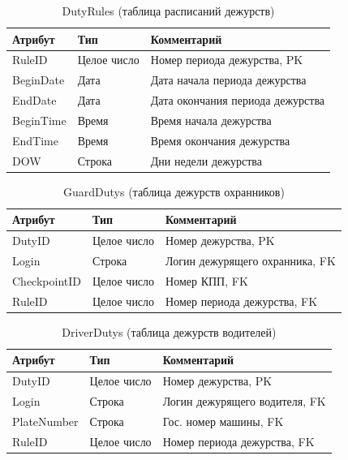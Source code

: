 \begin{table}[h!]
	\begin{center}
		\caption{DutyRules (таблица расписаний дежурств)}
		\label{dutyrule_table}
		\begin{tabular}{| p{3.8cm} | p{3cm} | p{7.2cm} |}
			\hline
			\textbf{Атрибут}		&	\textbf{Тип}		& \textbf{Комментарий} \\
			\hline
			RuleID		&	Целое число	&	Номер периода дежурства, PK \\ \hline
			BeginDate 	&	Дата		&	Дата начала периода дежурства \\ \hline
			EndDate 	&	Дата		&	Дата окончания периода дежурства \\ \hline
			BeginTime 	&	Время		&	Время начала дежурства \\ \hline
			EndTime 	&	Время		&	Время окончания дежурства \\ \hline
			DOW 		&	Строка		&	Дни недели дежурства \\ \hline
		\end{tabular}
	\end{center}
\end{table}

\begin{table}[h!]
	\begin{center}
		\caption{GuardDutys (таблица дежурств охранников)}
		\label{gduty_table}
		\begin{tabular}{| p{3.8cm} | p{3cm} | p{7.2cm} |}
			\hline
			\textbf{Атрибут}		&	\textbf{Тип}		& \textbf{Комментарий} \\
			\hline
			DutyID		&	Целое число	&	Номер дежурства, PK \\ \hline
			Login 		&	Строка		&	Логин дежурящего охранника, FK \\ \hline
			CheckpointID &	Целое число	&	Номер КПП, FK \\ \hline
			RuleID		&	Целое число	&	Номер периода дежурства, FK \\ \hline
		\end{tabular}
	\end{center}
\end{table}

\begin{table}[h!] 
	\begin{center}
		\caption{DriverDutys (таблица дежурств водителей)}
		\label{dduty_table}
		\begin{tabular}{| p{3.8cm} | p{3cm} | p{7.2cm} |}
			\hline
			\textbf{Атрибут}		&	\textbf{Тип}		& \textbf{Комментарий} \\
			\hline
			DutyID		&	Целое число	&	Номер дежурства, PK \\ \hline
			Login 		&	Строка		&	Логин дежурящего водителя, FK \\ \hline
			PlateNumber &	Строка		&	Гос. номер машины, FK \\ \hline
			RuleID		&	Целое число	&	Номер периода дежурства, FK \\ \hline
		\end{tabular}
	\end{center}
\end{table}

